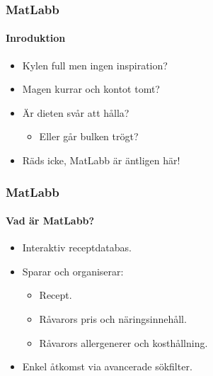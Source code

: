 





\begin{frame}
  \frametitle{MatLabb}
  \framesubtitle{Inroduktion}
  \begin{itemize}
  \item<1-> Kylen full men ingen inspiration?
  \item<2-> Magen kurrar och kontot tomt?
  \item<3-> Är dieten svår att hålla?
    \begin{itemize}
    \item<4-> Eller går bulken trögt?
    \end{itemize}
  \item<5-> Räds icke, MatLabb är äntligen här!
  \end{itemize}
\end{frame}








\begin{frame}
  \frametitle{MatLabb}
  \framesubtitle{Vad är MatLabb?}
  \begin{itemize}
  \item<1-> Interaktiv receptdatabas.
  \item<2-> Sparar och organiserar:
    \begin{itemize}
    \item<2-> Recept.
    \item<3-> Råvarors pris och näringsinnehåll.
    \item<4-> Råvarors allergenerer och kosthållning.
    \end{itemize}
  \item<5-> Enkel åtkomst via avancerade sökfilter.
  \end{itemize}
\end{frame}
